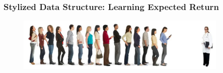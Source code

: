 \documentclass[11pt,table]{beamer}
\begin{document}
\begin{frame}\frametitle{Stylized Data Structure: Learning Expected Return}
\renewcommand{\baselinestretch}{1}
\begin{figure}[h]
\begin{center}
{\includegraphics[width=0.9\textwidth]{figures/queue.png}}
\end{center}
\end{figure}


\begin{table}[htbp]


\end{table}
\end{frame}
\end{document}

